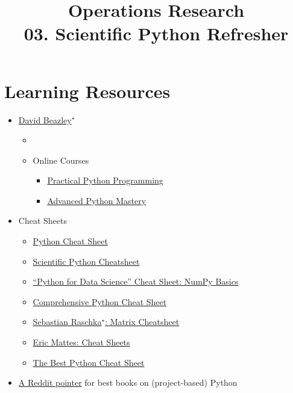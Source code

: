 \documentclass[11pt]{extarticle}
\theoremstyle{definition}
\begin{document}
\title{\texorpdfstring{\vspace{15mm} Operations Research\\ 03. Scientific Python Refresher}{Operations Research\\ 03. Scientific Python Refresher}} 
\author{}
\date{}
\maketitle
\newpage

\section*{Learning Resources}

\begin{itemize}\setlength{\itemsep}{-4pt}
  \item \href{https://www.dabeaz.com/}{David Beazley$^\star$}
    \vspace{-2mm}
    \begin{itemize}
      \item \citet{beazley_ess,beazley_dis,cookbook}
      \item Online Courses
        \begin{itemize}
          \item \href{https://github.com/dabeaz-course/practical-python}{Practical Python Programming}
          \item \href{https://github.com/dabeaz-course/python-mastery}{Advanced Python Mastery}
        \end{itemize}
    \end{itemize}
  \item Cheat Sheets
    \vspace{-2mm}
  \begin{itemize}
    \item \href{https://www.pythoncheatsheet.org/}{Python Cheat Sheet}
    \item \href{https://ipgp.github.io/scientific_python_cheat_sheet/}{Scientific Python Cheatsheet}
    \item \href{https://s3.amazonaws.com/assets.datacamp.com/blog_assets/Numpy_Python_Cheat_Sheet.pdf}{``Python for Data Science'' Cheat Sheet: NumPy Basics}
    \item \href{https://github.com/gto76/python-cheatsheet}{Comprehensive Python Cheat Sheet}
    \item \href{https://sebastianraschka.com/blog/2014/matrix_cheatsheet_table.html}{Sebastian Raschka$^\star$: Matrix Cheatsheet}
    \item \href{https://ehmatthes.github.io/pcc_3e/cheat_sheets/}{Eric Mattes: Cheat Sheets}
    \item \href{https://github.com/kieranholland/best-python-cheat-sheet}{The Best Python Cheat Sheet}
  \end{itemize}
  \item \href{https://www.reddit.com/r/Python/comments/103i4d2/what_are_the_best_books_to_learn_python/}{A Reddit pointer} for best books on (project-based) Python
\end{itemize}
\end{document}
